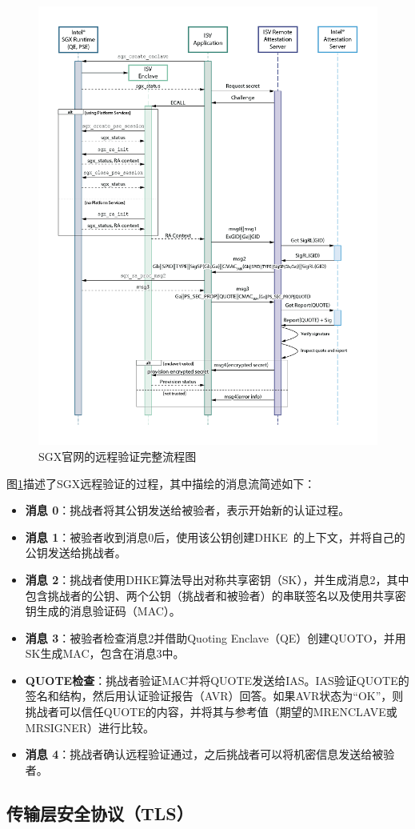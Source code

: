 \begin{figure}[!ht]
    \centering
    \includegraphics[width=.6\textwidth]{figures/sgx-ra.png}
    \caption{SGX官网的远程验证完整流程图}
    \label{fig:sgx-ra}
\end{figure}

图\ref{fig:sgx-ra}描述了SGX远程验证的过程，其中描绘的消息流简述如下：

\begin{itemize}
    \item \textbf{消息 0}：挑战者将其公钥发送给被验者，表示开始新的认证过程。
    \item \textbf{消息 1}：被验者收到消息0后，使用该公钥创建DHKE~\cite{Diffie1976NewDI}的上下文，并将自己的公钥发送给挑战者。
    \item \textbf{消息 2}：挑战者使用DHKE算法导出对称共享密钥（SK），并生成消息2，其中包含挑战者的公钥、两个公钥（挑战者和被验者）的串联签名以及使用共享密钥生成的消息验证码（MAC）。
    \item \textbf{消息 3}：被验者检查消息2并借助Quoting Enclave（QE）创建QUOTO，并用SK生成MAC，包含在消息3中。
    \item \textbf{QUOTE检查}：挑战者验证MAC并将QUOTE发送给IAS。IAS验证QUOTE的签名和结构，然后用认证验证报告（AVR）回答。如果AVR状态为“OK”，则挑战者可以信任QUOTE的内容，并将其与参考值（期望的MRENCLAVE或MRSIGNER）进行比较。
    \item \textbf{消息 4}：挑战者确认远程验证通过，之后挑战者可以将机密信息发送给被验者。
\end{itemize}

\subsection{传输层安全协议（TLS）}

